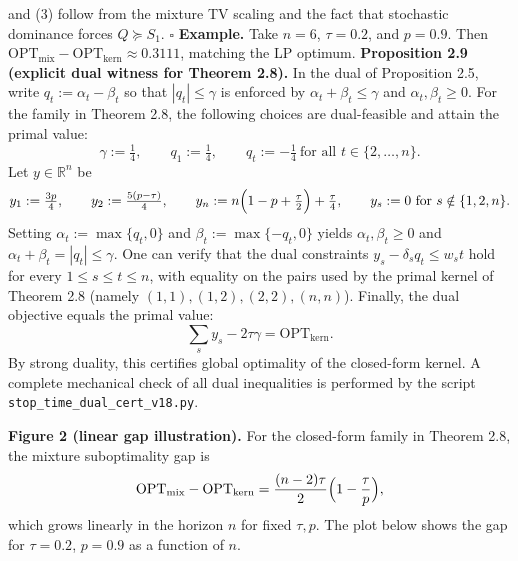 \documentclass[11pt]{article}
\begin{document}
and (3) follow from the mixture TV scaling and the fact that stochastic
dominance forces \(Q\succeq S_1\). \(\square\) \textbf{Example.} Take
\(n=6\), \(\tau=0.2\), and \(p=0.9\). Then
\(\mathrm{OPT}_{\mathrm{mix}}-\mathrm{OPT}_{\mathrm{kern}}\approx 0.3111\),
matching the LP optimum. \textbf{Proposition 2.9 (explicit dual witness
for Theorem 2.8).} In the dual of Proposition 2.5, write
\(q_t:=\alpha_t-\beta_t\) so that \(|q_t|\le \gamma\) is enforced by
\(\alpha_t+\beta_t\le \gamma\) and \(\alpha_t,\beta_t\ge 0\). For the
family in Theorem 2.8, the following choices are dual-feasible and
attain the primal value: \[
\gamma:=\tfrac14,\qquad q_1:=\tfrac14,\qquad q_t:=-\tfrac14\ \text{for all }t\in\{2,\dots,n\}.
\] Let \(y\in\mathbb{R}^n\) be \[
 y_1:=\tfrac{3p}{4},\qquad y_2:=\tfrac{5(p-\tau)}{4},\qquad y_n:=n\Bigl(1-p+\tfrac{\tau}{2}\Bigr)+\tfrac{\tau}{4},\qquad y_s:=0\ \text{for }s\notin\{1,2,n\}.
\] Setting \(\alpha_t:=\max\{q_t,0\}\) and \(\beta_t:=\max\{-q_t,0\}\)
yields \(\alpha_t,\beta_t\ge 0\) and
\(\alpha_t+\beta_t=|q_t|\le \gamma\). One can verify that the dual
constraints \(y_s-\delta_s q_t\le w_s t\) hold for every
\(1\le s\le t\le n\), with equality on the pairs used by the primal
kernel of Theorem 2.8 (namely \((1,1),(1,2),(2,2),(n,n)\)). Finally, the
dual objective equals the primal value: \[
\sum_s y_s -2\tau\gamma
= \mathrm{OPT}_{\mathrm{kern}}.
\] By strong duality, this certifies global optimality of the
closed-form kernel. A complete mechanical check of all dual inequalities
is performed by the script \texttt{stop\_time\_dual\_cert\_v18.py}.

\textbf{Figure 2 (linear gap illustration).} For the closed-form family
in Theorem 2.8, the mixture suboptimality gap is \[
\mathrm{OPT}_{\mathrm{mix}}-\mathrm{OPT}_{\mathrm{kern}}
= \frac{(n-2)\tau}{2}\Bigl(1-\frac{\tau}{p}\Bigr),
\] which grows linearly in the horizon \(n\) for fixed \(\tau,p\). The
plot below shows the gap for \(\tau=0.2\), \(p=0.9\) as a function of
\(n\).

\begin{center}
\end{center}
\end{document}
